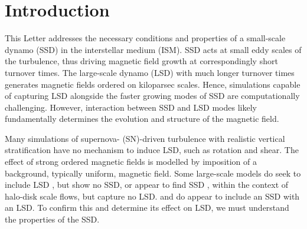 \documentclass[preprint2]{aastex63}
\newcommand{\fg}[1]{\textcolor{midgreen}{#1}}
\newcommand{\mm}[1]{\textcolor{mypurple}{#1}}
\begin{document}
\section{Introduction}\label{sec:intro}


 This \mm{L}etter addresses the necessary conditions and properties of a small-scale
 dynamo (SSD) in the interstellar medium (ISM).
 SSD acts at small eddy scales of the turbulence, thus driving magnetic field
 growth at correspondingly short turnover times.
 \fg{The large-scale dynamo (LSD) with much longer turnover times generates
 magnetic fields ordered on \mm{kiloparsec} scales.}
 Hence, simulations capable of capturing LSD alongside the faster growing modes
 of SSD are computationally challenging.
 However, \fg{interaction between SSD and LSD modes likely
 fundamentally} \mm{determines the} evolution and structure of the magnetic field.

 Many simulations of supernova- (SN)-driven turbulence with realistic vertical
 stratification \citep[e.g.,][]{deAvillez:2005,PO07,Hill:2012a,HI14} have no
 mechanism to induce LSD, such as rotation and shear.
 The effect of strong ordered magnetic fields is modelled by
 imposition of a background, typically uniform, magnetic field.
 \fg{Some large-scale models do seek to include LSD 
 \citep[e.g.,][]{Korpi:1999b,Gressel:2008,HWK09,WA09,Pakmor17,
 GE20}, but show no SSD, or appear to find SSD 
 \citep[e.g.,][]{RT16,SBADMN19}, within the context of halo-disk
 scale flows, but capture no LSD.}
 \citet{Gent:2013b} \mm{and} \citet{EGSFB16} do appear to include an
 \fg{SSD with} \mm{an} \fg{LSD}.
 To confirm this and determine its effect on LSD, we must understand the
 properties of the SSD.
     
\end{document}
